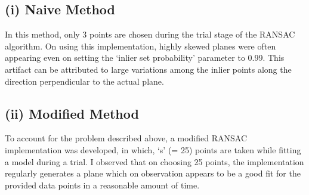 \documentclass[a4paper,fleqn,11pt]{article}
\theoremstyle{mytheor}
\begin{document}
\subsection*{(i) Naive Method}
In this method, only 3 points are chosen during the trial stage of the RANSAC algorithm. On using this implementation, highly skewed planes were often appearing even on setting the `inlier set probability' parameter to 0.99. This artifact can be attributed to large variations among the inlier points along the direction perpendicular to the actual plane.
\subsection*{(ii) Modified Method}
To account for the problem described above, a modified RANSAC implementation was developed, in which, `s' (= 25) points are taken while fitting a model during a trial. I observed that on choosing 25 points, the implementation regularly generates a plane which on observation appears to be a good fit for the provided data points in a reasonable amount of time.
\end{document}
